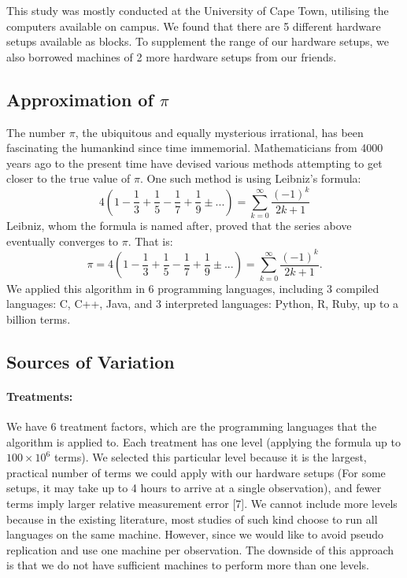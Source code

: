 \documentclass[12pt,halfline,a4paper,]{ouparticle}
\begin{document}
This study was mostly conducted at the University of Cape Town,
utilising the computers available on campus. We found that there are 5
different hardware setups available as blocks. To supplement the range
of our hardware setups, we also borrowed machines of 2 more hardware
setups from our friends.

\hypertarget{approximation-of-pi}{%
\subsection{\texorpdfstring{Approximation of
\(\pi\)}{Approximation of \textbackslash pi}}\label{approximation-of-pi}}

The number \(\pi\), the ubiquitous and equally mysterious irrational,
has been fascinating the humankind since time immemorial. Mathematicians
from 4000 years ago to the present time have devised various methods
attempting to get closer to the true value of \(\pi\). One such method
is using Leibniz's formula: \[
4 \left( 1 - \frac{1}{3} + \frac{1}{5} - \frac{1}{7} + \frac{1}{9} ±... \right) = \sum_{k=0}^{\infty}\frac{(-1)^k}{2k+1}
\] Leibniz, whom the formula is named after, proved that the series
above eventually converges to \(\pi\). That is: \[
\pi = 4 \left( 1 - \frac{1}{3} + \frac{1}{5} - \frac{1}{7} + \frac{1}{9} ±... \right) = \sum_{k=0}^{\infty}\frac{(-1)^k}{2k+1}.
\] We applied this algorithm in 6 programming languages, including 3
compiled languages: C, C++, Java, and 3 interpreted languages: Python,
R, Ruby, up to a billion terms.

\hypertarget{sources-of-variation}{%
\subsection{Sources of Variation}\label{sources-of-variation}}

\hypertarget{treatments}{%
\paragraph{Treatments:}\label{treatments}}

We have 6 treatment factors, which are the programming languages that
the algorithm is applied to. Each treatment has one level (applying the
formula up to \(100 \times 10^6\) terms). We selected this particular
level because it is the largest, practical number of terms we could
apply with our hardware setups (For some setups, it may take up to 4
hours to arrive at a single observation), and fewer terms imply larger
relative measurement error {[}7{]}. We cannot include more levels
because in the existing literature, most studies of such kind choose to
run all languages on the same machine. However, since we would like to
avoid pseudo replication and use one machine per observation. The
downside of this approach is that we do not have sufficient machines to
perform more than one levels.
\end{document}
